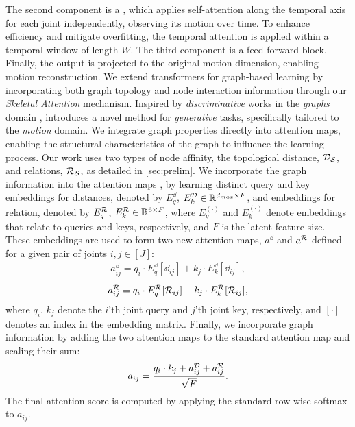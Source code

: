 The second component is a \emph{\tempattn}, which applies self-attention along the temporal axis for each joint independently, observing its motion over time. 
To enhance efficiency and mitigate overfitting, the temporal attention is applied within a temporal window of length $W$. 
The third component is a feed-forward block.
Finally, the output is projected to the original motion dimension, enabling motion reconstruction.
We extend transformers for graph-based learning by incorporating both graph topology and node interaction information through our \emph{Skeletal Attention} mechanism. Inspired by \emph{discriminative} works in the \emph{graphs} domain \cite{ying2021transformers}, \algoname introduces a novel method for \emph{generative} tasks, specifically tailored to the \emph{motion} domain.
We integrate graph properties directly into attention maps, enabling the structural characteristics of the graph to influence the learning process. 
Our work uses two types of node affinity, the topological distance, $\mathcal{D}_{\mathcal{S}}$, and relations, $\mathcal{R}_{\mathcal{S}}$, as detailed in \cref{sec:prelim}.
We incorporate the graph information into the attention maps \cite{park2022grpe}, by learning distinct query and key embeddings for distances, denoted by 
$E^\dd_q$, $E^{\mathcal{D}}_k \in \mathbb{R}^{d_{max} \times F}$,
and embeddings for relation, denoted by 
$E^{\mathcal{R}}_q$, $E^{\mathcal{R}}_k \in \mathbb{R}^{6\times F}$, 
where $E^{(\cdot)}_q$ and $E^{(\cdot)}_k$ denote embeddings that relate to queries and keys, respectively, and $F$ is the latent feature size. 
These embeddings are used to form two new attention maps, $a^{\dd}$ and $a^{\mathcal{R}}$ defined for a given pair of joints $i, j \in [J]$: 
    \begin{align}
        a^{\dd}_{ij}=q_i \cdot E^\dd_q [\dd_{ij}] + k_j \cdot E^\dd_k [\dd_{ij}],
    \end{align}
    \begin{align}
        a^{\mathcal{R}}_{ij}=q_i \cdot E^{\mathcal{R}}_q [\mathcal{R}_{ij}] + k_j \cdot E^{\mathcal{R}}_k [\mathcal{R}_{ij}],
    \end{align}
where $q_i$, $k_j$ denote the $i$'th joint query and $j$'th joint key, respectively, and $[\cdot]$ denotes an index in the embedding matrix.
Finally, we incorporate graph information by adding the two attention maps to the standard attention map and scaling their sum:
\begin{align}
        a_{ij} = \frac{q_i \cdot k_j + a^{\mathcal{D}}_{ij} + a^{\mathcal{R}}_{ij}}{\sqrt{F}}.
\end{align}
The final attention score is computed by applying the standard row-wise softmax to $a_{ij}$.

